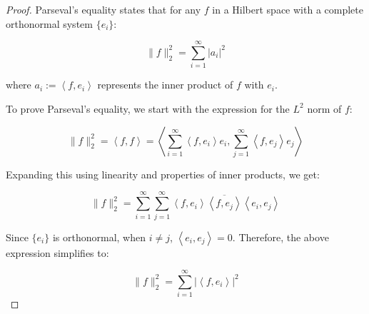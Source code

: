 \begin{proof}
    Parseval's equality states that for any $f$ in a Hilbert 
    space with a complete orthonormal system $\{e_i\}$:

$$
\|f\|_{2}^{2} = \sum_{i=1}^{\infty} |a_{i}|^{2}
$$

where $a_{i}:=\left<f,e_i\right>$ represents the inner 
product of $f$ with $e_i$.

To prove Parseval's equality, we start with the expression 
for the $L^2$ norm of $f$:

$$
\|f\|_{2}^{2} = \left<f, f\right> = \left<\sum_{i=1}^{\infty} 
\left<f,e_i\right>e_i, \sum_{j=1}^{\infty} \left<f,e_j\right>e_j\right>
$$

Expanding this using linearity and properties of inner products, 
we get:

$$
\|f\|_{2}^{2} = \sum_{i=1}^{\infty} \sum_{j=1}^{\infty} 
\left<f,e_i\right>\overline{\left<f,e_j\right>}\left<e_i,e_j\right>
$$

Since $\{e_i\}$ is orthonormal, when $i\neq j$, 
$\left<e_i,e_j\right>=0$. Therefore, the above expression 
simplifies to:

$$
\|f\|_{2}^{2} = \sum_{i=1}^{\infty} |\left<f,e_i\right>|^2
$$
\end{proof}
